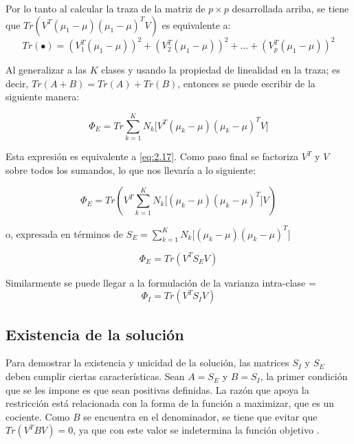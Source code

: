  Por lo tanto al calcular la traza de la matriz de $p \times p$ desarrollada arriba, se tiene que $Tr(V^T (\mu_1 - \mu) (\mu_1 - \mu)^T V)$ es equivalente a:
 \begin{equation*}
Tr(\bullet) = (V_1^T (\mu_1-\mu))^2+ (V_2^T (\mu_1-\mu) )^2 + \hdots + (V_p^T (\mu_1-\mu) )^2
 \end{equation*}

Al generalizar a las $K$ clases y usando la propiedad de linealidad en la traza; es decir, $Tr(A+B) = Tr(A)+Tr(B)$, entonces se puede escribir de la siguiente manera:

\begin{equation*}
\Phi_E = Tr \sum\limits_{k = 1}^{K} N_{k}  \big[ V^T (\mu_k - \mu) (\mu_k - \mu)^T V \big]
\end{equation*}


Esta expresión es equivalente a \ref{eq:2.17}. Como paso final se factoriza $V^T$ y $V$ sobre todos los sumandos, lo que nos llevaría a lo siguiente:

\begin{equation*} 
\Phi_E =  Tr (V^T \sum\limits_{k = 1}^{K} N_{k}  \big[(\mu_k - \mu) (\mu_k - \mu)^T \big] V)   
\end{equation*}

o, expresada en términos de $S_E = \sum\limits_{k = 1}^{K} N_{k}  \big[(\mu_k - \mu) (\mu_k - \mu)^T \big]$

\begin{equation}\label{eq:2.19}
\Phi_E =  Tr (V^T S_E V)     
\end{equation}

Similarmente se puede llegar a la formulación de la varianza intra-clase = 
\begin{equation}\label{eq:2.20}
\Phi_{I} =  Tr (V^T S_I V )
\end{equation}



\subsection{Existencia de la solución}

Para demostrar la existencia y unicidad de la solución, las matrices $S_I$ y $S_E$ deben cumplir ciertas características. Sean $A = S_E$ y $B = S_I$, la primer condición que se les impone es que sean positivas definidas. La razón que apoya la restricción está relacionada con la forma de la función a maximizar, que es un cociente. Como $B$ se encuentra en el denominador, se tiene que evitar que $Tr(V^T B V) = 0$, ya que con este valor se indetermina la función objetivo \cite{ngo2012trace}. 

